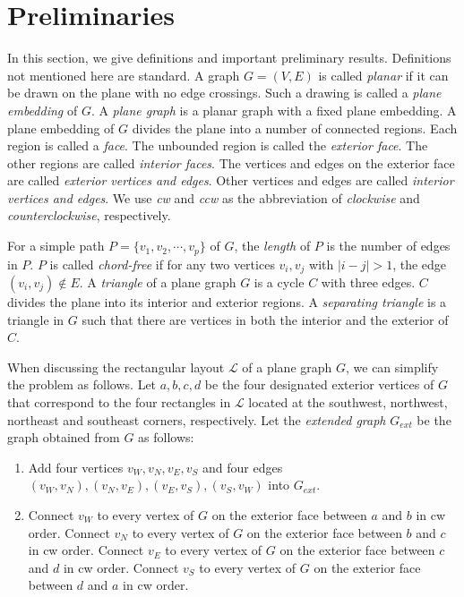 \documentclass[11pt]{article}
\newcommand{\LL}{\mathcal{L}}
\begin{document}
\section{Preliminaries}\label{sec:pre-universal}


In this section, we give definitions and important preliminary results.
Definitions not mentioned here are standard. A graph $G=(V,E)$ is called
{\em planar} if it can be drawn on the plane with no edge
crossings. Such a drawing is called a {\em plane embedding} of $G$.
A {\em plane graph} is a planar graph with a fixed plane embedding.
A plane embedding of $G$ divides the plane into a number of connected
regions. Each region is called a {\em face}. The unbounded region is called
the {\em exterior face}. The other regions are called {\em interior faces}.
The vertices and edges on the exterior face are called {\em exterior
vertices and edges}. Other vertices and edges are called {\em interior vertices
and edges}. We use {\em cw} and {\em ccw} as the abbreviation of {\em clockwise}
and {\em counterclockwise}, respectively.

For a simple path $P=\{v_1, v_2, \cdots, v_p\}$ of $G$, the {\em length}
of $P$ is the number of edges in $P$. $P$ is called \emph{chord-free} if
for any two vertices $v_i, v_j$ with $|i-j|>1$, the edge $(v_i, v_j)\notin E$.
A {\em triangle} of a plane graph $G$ is a cycle $C$ with three edges.
$C$ divides the plane into its interior and exterior regions.
A {\em separating triangle} is a triangle in $G$ such that
there are vertices in both the interior and the exterior of $C$.

When discussing the rectangular layout $\LL$ of a plane graph $G$, we can simplify
the problem as follows. Let $a,b,c,d$ be the four designated exterior vertices of $G$
that correspond to the four rectangles in $\LL$ located at the southwest,
northwest, northeast and southeast corners, respectively. Let the
{\em extended graph} $G_{ext}$ be the graph obtained from $G$ as follows:

\begin{enumerate}
\item Add four vertices $v_W,v_N,v_E,v_S$ and four edges
$(v_W,v_N),(v_N,v_E),(v_E,v_S),(v_S,v_W)$ into $G_{ext}$.
\item
Connect $v_W$ to every vertex of $G$ on the exterior face between $a$ and $b$
in cw order.
Connect $v_N$ to every vertex of $G$ on the exterior face between $b$ and $c$
in cw order.
Connect $v_E$ to every vertex of $G$ on the exterior face between $c$ and $d$
in cw order.
Connect $v_S$ to every vertex of $G$ on the exterior face between $d$ and $a$
in cw order.
\end{enumerate}
\end{document}
